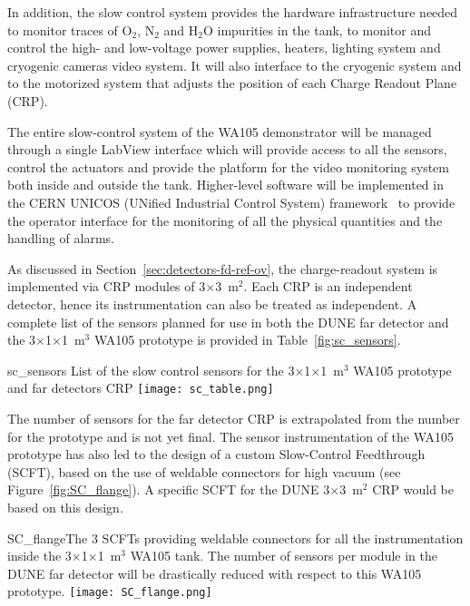 In addition, the slow control system provides the hardware infrastructure
needed to monitor traces of O$_2$, N$_2$ and H$_2$O impurities in the tank, to
monitor and control the high- and low-voltage power supplies, heaters,
lighting system and cryogenic cameras video system. It will also
interface to the cryogenic system and to the motorized system that
adjusts the position of each Charge Readout Plane (CRP).

The entire slow-control system of the WA105 demonstrator will be
managed through a single LabView interface  which will provide access
to all the sensors, control the actuators and provide the platform for
the video %
monitoring system both inside and outside the tank. 
Higher-level software will be implemented in the CERN UNICOS
(UNified Industrial Control System) framework~\cite{unicos} to
provide the operator interface for the monitoring of all the
physical quantities and the handling of alarms. %

As discussed in Section~\ref{sec:detectors-fd-ref-ov}, the
charge-readout system %
is implemented via CRP
modules of 3$\times$3~m$^2$. Each %
CRP is an
independent detector, hence its instrumentation can also be treated as
independent. A complete list of the sensors planned %
for use in both the %
DUNE far detector and the
3$\times$1$\times$1~m$^3$ WA105 prototype is provided in
Table~\ref{fig:sc_sensors}. 
\begin{cdrfigure}{sc_sensors}
{List of the slow control sensors for the 3$\times$1$\times$1~m$^3$ WA105 prototype and far detectors CRP}
 \texttt{[image: sc\_table.png]} %
 \end{cdrfigure}
The number of sensors for the
far detector CRP is extrapolated from the number for %
the %
prototype and is not yet final.
The sensor instrumentation of the %
WA105
prototype has also led to the design of a custom Slow-Control
Feedthrough (SCFT), based on the use of weldable connectors for high
vacuum (see Figure~\ref{fig:SC_flange}). A specific SCFT for the DUNE 
3$\times$3~m$^2$ CRP would be based on this design.
\begin{cdrfigure}{SC_flange}{The 3 SCFTs providing 
weldable connectors for all the instrumentation inside the 3$\times$1$\times$1~m$^3$  WA105 tank. 
The number of sensors per module in the DUNE far detector will be drastically 
reduced with respect to this WA105 prototype.}
  \texttt{[image: SC\_flange.png]}
 \end{cdrfigure}
